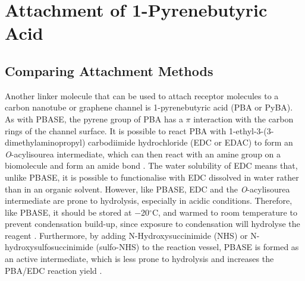 \documentclass[
  a4paper,
]{scrbook}
\begin{document}
\hypertarget{sec-PBA}{%
\section{Attachment of 1-Pyrenebutyric Acid}\label{sec-PBA}}

\hypertarget{comparing-attachment-methods-1}{%
\subsection{Comparing Attachment
Methods}\label{comparing-attachment-methods-1}}

Another linker molecule that can be used to attach receptor molecules to
a carbon nanotube or graphene channel is 1-pyrenebutyric acid (PBA or
PyBA). As with PBASE, the pyrene group of PBA has a \(\pi\) interaction
with the carbon rings of the channel surface. It is possible to react
PBA with 1-ethyl-3-(3-dimethylaminopropyl) carbodiimide hydrochloride
(EDC or EDAC) to form an \emph{O}-acylisourea intermediate, which can
then react with an amine group on a biomolecule and form an amide bond
\autocite{Sehgal1994,Hermanson2013-4}. The water solubility of EDC means
that, unlike PBASE, it is possible to functionalise with EDC dissolved
in water rather than in an organic solvent. However, like PBASE, EDC and
the \emph{O}-acylisourea intermediate are prone to hydrolysis,
especially in acidic conditions. Therefore, like PBASE, it should be
stored at −20\(^\circ\)C, and warmed to room temperature to prevent
condensation build-up, since exposure to condensation will hydrolyse the
reagent \autocite{Hermanson2013-4}. Furthermore, by adding
N-Hydroxysuccinimide (NHS) or N-hydroxysulfosuccinimide (sulfo-NHS) to
the reaction vessel, PBASE is formed as an active intermediate, which is
less prone to hydrolysis and increases the PBA/EDC reaction yield
\autocite{Sehgal1994,Hermanson2013-4,Hermanson2013-14}.
\end{document}
